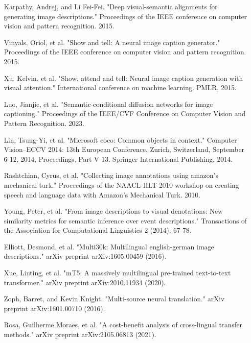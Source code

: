 \documentclass[lettersize,journal]{IEEEtran}
\begin{document}
\begin{thebibliography}{1}


Karpathy, Andrej, and Li Fei-Fei. "Deep visual-semantic alignments for generating image descriptions." Proceedings of the IEEE conference on computer vision and pattern recognition. 2015.

Vinyals, Oriol, et al. "Show and tell: A neural image caption generator." Proceedings of the IEEE conference on computer vision and pattern recognition. 2015.

Xu, Kelvin, et al. "Show, attend and tell: Neural image caption generation with visual attention." International conference on machine learning. PMLR, 2015.

Luo, Jianjie, et al. "Semantic-conditional diffusion networks for image captioning." Proceedings of the IEEE/CVF Conference on Computer Vision and Pattern Recognition. 2023.

Lin, Tsung-Yi, et al. "Microsoft coco: Common objects in context." Computer Vision–ECCV 2014: 13th European Conference, Zurich, Switzerland, September 6-12, 2014, Proceedings, Part V 13. Springer International Publishing, 2014.

Rashtchian, Cyrus, et al. "Collecting image annotations using amazon’s mechanical turk." Proceedings of the NAACL HLT 2010 workshop on creating speech and language data with Amazon’s Mechanical Turk. 2010.

Young, Peter, et al. "From image descriptions to visual denotations: New similarity metrics for semantic inference over event descriptions." Transactions of the Association for Computational Linguistics 2 (2014): 67-78.

Elliott, Desmond, et al. "Multi30k: Multilingual english-german image descriptions." arXiv preprint arXiv:1605.00459 (2016).

Xue, Linting, et al. "mT5: A massively multilingual pre-trained text-to-text transformer." arXiv preprint arXiv:2010.11934 (2020).

Zoph, Barret, and Kevin Knight. "Multi-source neural translation." arXiv preprint arXiv:1601.00710 (2016).

Rosa, Guilherme Moraes, et al. "A cost-benefit analysis of cross-lingual transfer methods." arXiv preprint arXiv:2105.06813 (2021).


\end{thebibliography}
\end{document}
